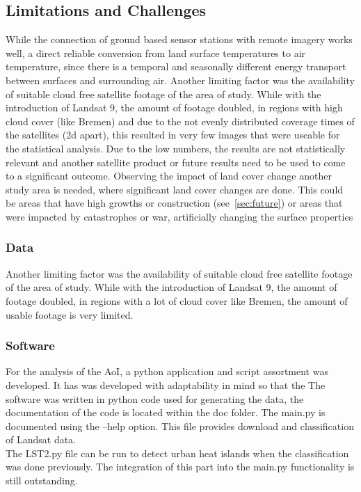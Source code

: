 \documentclass[12pt,a4paper, english,twoside]{scrartcl}
\begin{document}
 \subsection{Limitations and Challenges}
   While the connection of ground based sensor stations with remote imagery works well, a direct reliable conversion from land surface temperatures to air temperature, since there is a temporal and seasonally different energy transport between surfaces and surrounding air. 
   Another limiting factor was the availability of suitable cloud free satellite footage of the area of study.
   While with the introduction of Landsat 9, the amount of footage doubled, in regions with high cloud cover (like Bremen) and due to the not evenly distributed coverage times of the satellites (2d apart), this resulted in very few images that were useable for the statistical analysis. 
   Due to the low numbers, the results are not statistically relevant and another satellite product or future results need to be used to come to a significant outcome. 
   Observing the impact of land cover change another study area is needed, where significant land cover changes are done. 
   This could be areas that have high growths or construction (see~\cref{sec:future}) or areas that were impacted by catastrophes or war, artificially changing the surface properties 

 \subsubsection{Data}
  Another limiting factor was the availability of suitable cloud free satellite footage of the area of study.
  While with the introduction of Landsat 9, the amount of footage doubled, in regions with a lot of cloud cover like Bremen, the amount of usable footage is very limited.

 \subsubsection{Software}\label{sec:sw}
  For the analysis of the \gls{AoI}, a python application and script assortment was developed. 
  It has was developed with adaptability in mind so that the 
  The software was written in python code used for generating the data, the documentation of the code is located within the doc folder.
  The main.py is documented using the --help option.
  This file provides download and classification of Landsat data.\\ 
  The LST2.py file can be run to detect urban heat islands when the classification was done previously. 
  The integration of this part into the main.py functionality is still outstanding. 

\newpage
\end{document}
